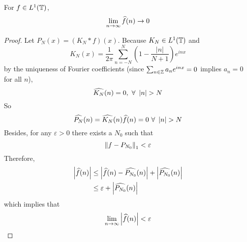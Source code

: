 \begin{enumerate}[label=\arabic*.]
	\begin{cor}
		For $f \in L^1(\mathbb{T})$, 
		\begin{equation*}
			\lim_{n \rightarrow \infty} \widehat{f}(n) \rightarrow 0
		\end{equation*}
	\end{cor}
	\begin{proof}
		Let $P_N(x) = (K_N * f)(x)$. Because $K_N \in L^1(\mathbb{T})$ and 
		\begin{equation*}
			K_N(x) =  \frac{1}{2\pi}\sum_{n = -N}^N \left(1-\frac{|n|}{N+1}\right) e^{i n x}
		\end{equation*}
		by the uniqueness of Fourier coefficients (since $\sum_{n \in \mathbb{Z}}a_n e^{inx} = 0$ implies $a_n = 0$ for all $n$),
		\begin{equation*}
			\widehat{K_N}(n) = 0,~\forall~\left\lvert n\right\lvert > N
		\end{equation*}
		So
		\begin{equation*}
			\widehat{P_N}(n) = \widehat{K_N}(n)\widehat{f}(n) = 0~\forall~\left\lvert n\right\lvert > N
		\end{equation*}
		Besides, for any $\varepsilon > 0$ there exists a $N_0$ such that 
		\begin{equation*}
			\left\lVert f - P_{N_0}\right\lVert_1 < \varepsilon
		\end{equation*}
		Therefore,
		\begin{equation*}
			\begin{aligned}
				\left\lvert\widehat{f}(n)\right\lvert &\leq \left\lvert\widehat{f}(n)-\widehat{P_{N_0}}(n)\right\lvert+\left\lvert\widehat{P_{N_0}}(n)\right\lvert \\
				&\leq \varepsilon + \left\lvert\widehat{P_{N_0}}(n)\right\lvert
			\end{aligned}
		\end{equation*}
		which implies that 
		\begin{equation*}
			\lim_{n\rightarrow \infty}\left\lvert\widehat{f}(n)\right\lvert < \varepsilon
		\end{equation*}
	\end{proof}



\end{enumerate}
